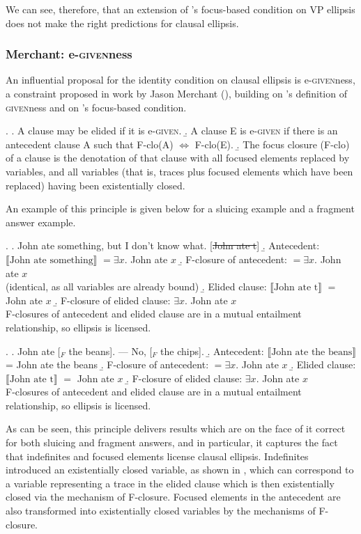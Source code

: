\documentclass[doublespace]{umthesis}
\newcommand{\ext}[1]{\ensuremath{\llbracket \textrm{{#1}} \rrbracket}}
\begin{document}
We can see, therefore, that an extension of \cite{Ro92}'s focus-based condition on VP ellipsis does not make the right predictions for clausal ellipsis.

\subsubsection{Merchant: e-\textsc{given}ness} \label{sec:egivenness}

An influential proposal for the identity condition on clausal ellipsis is e-\textsc{given}ness, a constraint proposed in work by Jason Merchant (\cite{Me01, Me04}), building on \cite{Sc99}'s definition of \textsc{given}ness and on \cite{Ro92}'s focus-based condition.

\ex. 	\label{e-givenness}\a. A clause may be elided if it is e-\textsc{given}.
	\b. A clause E is e-\textsc{given} if there is an antecedent clause A such that F-clo(A) $\Leftrightarrow$ F-clo(E).
	\b. The focus closure (F-clo) of a clause is the denotation of that clause with all focused elements replaced by variables, and all variables (that is, traces plus focused elements which have been replaced) having been existentially closed.
	
An example of this principle is given below for a sluicing example and a fragment answer example.

\ex. 	\a. John ate something, but I don't know what. [\sout{John ate t}]
	\b. Antecedent: \ext{John ate something} $ = \exists x. $ John ate $x$
	\b. F-closure of antecedent: $ = \exists x. $ John ate $x$\\
		(identical, as all variables are already bound)
	\b. Elided clause: \ext{John ate t} $ = $ John ate $x$
	\b. F-closure of elided clause: $\exists x. $ John ate $x$\\
		F-closures of antecedent and elided clause are in a mutual entailment relationship, so ellipsis is licensed.
		
\ex. 	\a. John ate [$_F$ the beans]. --- No, [$_F$ the chips].
	\b. Antecedent: \ext{John ate the beans} = John ate the beans
	\b. F-closure of antecedent: $ = \exists x. $ John ate $x$
	\b. Elided clause: \ext{John ate t} $ = $ John ate $x$
	\b. F-closure of elided clause: $\exists x. $ John ate $x$\\
		F-closures of antecedent and elided clause are in a mutual entailment relationship, so ellipsis is licensed.

As can be seen, this principle delivers results which are on the face of it correct for both sluicing and fragment answers, and in particular, it captures the fact that indefinites and focused elements license clausal ellipsis. Indefinites introduced an existentially closed variable, as shown in \LLast, which can correspond to a variable representing a trace in the elided clause which is then existentially closed via the mechanism of F-closure. Focused elements in the antecedent are also transformed into existentially closed variables by the mechanisms of F-closure.
\end{document}
